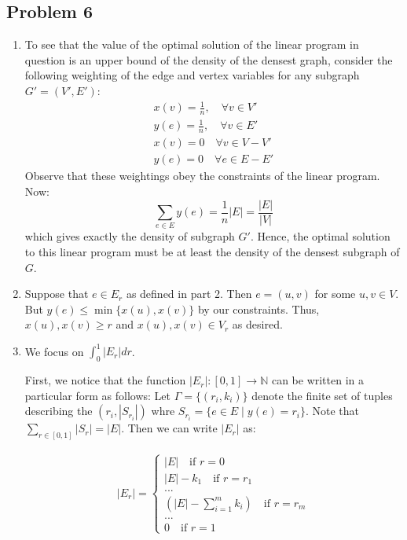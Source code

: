 \documentclass[12pt]{article}%
\begin{document}
\subsection*{Problem 6}
\begin{enumerate}
  \item To see that the value of the optimal solution of the linear program in question is an upper bound of the density of the densest graph, consider the following weighting of the edge and vertex variables for any subgraph $G' = (V',E')$:
  \begin{gather*}
    x(v) = \frac{1}{n}, \quad \forall v \in V' \\
    y(e) = \frac{1}{n}, \quad \forall v \in E' \\
    x(v) = 0 \quad \forall v \in V -V' \\
    y(e) = 0 \quad \forall e \in  E - E'
  \end{gather*}
  Observe that these weightings obey the constraints of the linear program. Now:
  $$\sum_{e \in E} y(e) = \frac{1}{n}|E| = \frac{|E|}{|V|} $$ which gives exactly the density of subgraph $G'$.
   Hence, the optimal solution to this linear program must be at least the density of the densest subgraph of $G$.
   \item Suppose that $e \in E_r$ as defined in part 2. Then $e = (u,v)$ for some $u,v \in V$. But $y(e) \leq \min\{x(u),x(v)\}$ by our constraints. Thus, $x(u),x(v) \geq r$ and $x(u),x(v) \in V_r$ as desired.
   \item We focus on $\int_{0}^1|E_r| dr$.

   First, we notice that the function $|E_r|:[0,1] \rightarrow \mathbb{N}$ can be written in a particular form as follows: Let $\Gamma = \{(r_i,k_i)\}$ denote the finite set of tuples describing the $(r_i,|S_{r_i}|)$ whre $S_{r_i} = \{e \in E \mid y(e) = r_i\}$. Note that $\sum_{r \in [0,1]} |S_{r}| = |E|$. Then we can write $|E_r|$ as:

   \begin{gather*}
     |E_r| = \begin{cases}
                |E| \quad \text{if }r = 0 \\
                |E| - k_1 \quad \text{if }r = r_1 \\
                ... \\
                (|E| - \sum_{i=1}^m k_i) \quad \text{if } r = r_m \\
                ... \\
                0 \quad \text{if } r = 1
             \end{cases}
   \end{gather*}


\end{enumerate}
\end{document}
